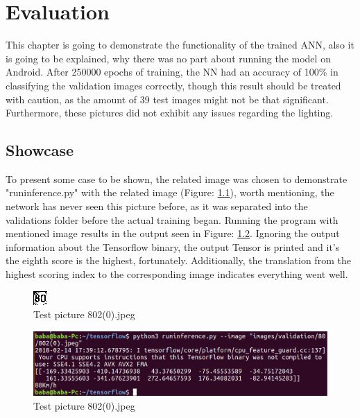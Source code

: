 
\chapter{Evaluation}\label{chapter:Evaluation}
This chapter is going to demonstrate the functionality of the trained ANN, also it is going to be explained, why there was no part about running the model on Android. After 250000 epochs of training, the NN had an accuracy of 100\% in classifying the validation images correctly, though this result should be treated with caution, as the amount of 39 test images might not be that significant. Furthermore, these pictures did not exhibit any issues regarding the lighting. 

\section{Showcase}\label{sec:showcase}
To present some case to be shown, the related image was chosen to demonstrate "runinference.py" with the related image (Figure: \ref{fig:802}), worth mentioning, the network has never seen this picture before, as it was separated into the validations folder before the actual training began. Running the program with mentioned image results in the output seen in Figure: \ref{fig:programout}. Ignoring the output information about the Tensorflow binary, the output Tensor is printed and it's the eighth score is the highest, fortunately. Additionally, the translation from the highest scoring index to the corresponding image indicates everything went well. 

\begin{figure}[H]
	\centering
	\includegraphics[width=0.4\linewidth]{images/802(0).jpeg}
	\caption{Test picture 802(0).jpeg}\label{fig:802}
\end{figure}


\begin{figure}[H]
	\centering
	\includegraphics[width=\linewidth]{images/program.png}
	\caption{Test picture 802(0).jpeg}\label{fig:programout}
\end{figure}


